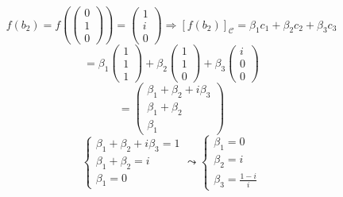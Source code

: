 \documentclass[a4paper]{article}
\theoremstyle{break}
\theoremstyle{break}
\theoremstyle{break}
\theoremstyle{break}
\begin{document}
\begin{enumerate}
	      \vspace{1em}
	      \[
		      f(b_2) = f \left( \begin{pmatrix} 0 \\ 1 \\ 0 \end{pmatrix} \right)
		      = \begin{pmatrix}
			      1 \\
			      i \\
			      0
		      \end{pmatrix}
		      \Rightarrow
		      [f(b_2)]_{\mathcal{C}} = \beta_1 c_1 + \beta_2 c_2 + \beta_3 c_3
	      \]
	      \[
		      = \beta_1 \begin{pmatrix} 1\\1\\1 \end{pmatrix}
		      + \beta_2 \begin{pmatrix} 1\\1\\0 \end{pmatrix}
		      + \beta_3 \begin{pmatrix} i\\0\\0 \end{pmatrix}
	      \]
	      \[
		      = \begin{pmatrix}
			      \beta_1 + \beta_2 + i\beta_3 \\
			      \beta_1 + \beta_2            \\
			      \beta_1
		      \end{pmatrix}
	      \]
	      \[
		      \begin{cases}
			      \beta_1 + \beta_2 + i\beta_3 = 1 \\
			      \beta_1 + \beta_2 = i            \\
			      \beta_1 = 0
		      \end{cases}
		      \leadsto
		      \begin{cases}
			      \beta_1 = 0 \\
			      \beta_2 = i \\
			      \beta_3 = \frac{1-i}{i}
		      \end{cases}
	      \]


\end{enumerate}
\end{document}
